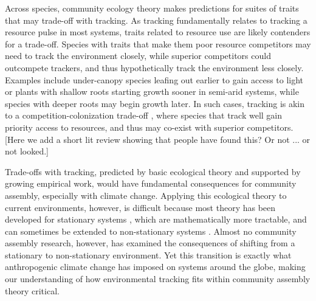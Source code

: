 \documentclass[11pt,letterpaper]{article}
\begin{document}
Across species, community ecology theory makes predictions for suites of traits that may trade-off with tracking. As tracking fundamentally relates to tracking a resource pulse in most systems, traits related to resource use are likely contenders for a trade-off. Species with traits that make them poor resource competitors may need to track the environment closely, while superior competitors could outcompete trackers, and thus hypothetically track the environment less closely. Examples include under-canopy species leafing out earlier to gain access to light or plants with shallow roots starting growth sooner in semi-arid systems, while species with deeper roots may begin growth later. In such cases, tracking is akin to a competition-colonization trade-off \citep{Amarasekare:2003tq}, where species that track well gain priority access to resources, and thus may co-exist with superior competitors. [Here we add a short lit review showing that people have found this? Or not ... or not looked.]

Trade-offs with tracking, predicted by basic ecological theory and supported by growing empirical work, would have fundamental consequences for community assembly, especially with climate change. Applying this ecological theory to current environments, however, is difficult because most theory has been developed for stationary systems \citep[as is the case in other sciences also, ][]{Milly:2008yu}, which are mathematically more tractable, and can sometimes be extended to non-stationary systems \citep{chessonnonstat}. Almost no community assembly research, however, has examined the consequences of shifting from a stationary to non-stationary environment. Yet this transition is exactly what anthropogenic climate change has imposed on systems around the globe, making our understanding of how environmental tracking fits within community assembly theory critical. 

\end{document}
